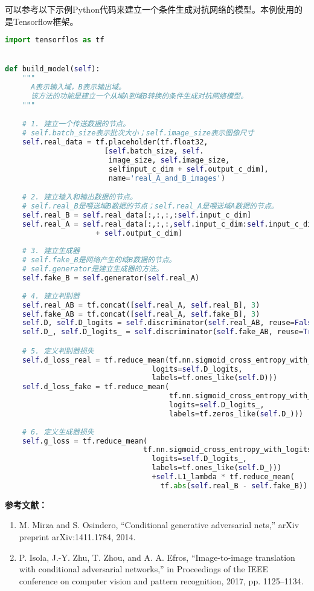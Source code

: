 可以参考以下示例Python代码来建立一个条件生成对抗网络的模型。本例使用的是Tensorflow框架。
\begin{lstlisting}[language=python]
import tensorflos as tf


def build_model(self):
    """
      A表示输入域，B表示输出域。
      该方法的功能是建立一个从域A到域B转换的条件生成对抗网络模型。
    """

    # 1. 建立一个传送数据的节点。
    # self.batch_size表示批次大小；self.image_size表示图像尺寸
    self.real_data = tf.placeholder(tf.float32,
                       [self.batch_size, self.    
                        image_size, self.image_size,
                        selfinput_c_dim + self.output_c_dim],
                        name='real_A_and_B_images')

    # 2. 建立输入和输出数据的节点。
    # self.real_B是喂送域B数据的节点；self.real_A是喂送域A数据的节点。
    self.real_B = self.real_data[:,:,:,:self.input_c_dim]
    self.real_A = self.real_data[:,:,:,self.input_c_dim:self.input_c_dim 
                     + self.output_c_dim]
    
    # 3. 建立生成器
    # self.fake_B是网络产生的域B数据的节点。
    # self.generator是建立生成器的方法。
    self.fake_B = self.generator(self.real_A)
    
    # 4. 建立判别器
    self.real_AB = tf.concat([self.real_A, self.real_B], 3)
    self.fake_AB = tf.concat([self.real_A, self.fake_B], 3)
    self.D, self.D_logits = self.discriminator(self.real_AB, reuse=False)
    self.D_, self.D_logits_ = self.discriminator(self.fake_AB, reuse=True)

    # 5. 定义判别器损失
    self.d_loss_real = tf.reduce_mean(tf.nn.sigmoid_cross_entropy_with_logits(
                                  logits=self.D_logits, 
                                  labels=tf.ones_like(self.D)))
    self.d_loss_fake = tf.reduce_mean(
                                      tf.nn.sigmoid_cross_entropy_with_logits(
                                      logits=self.D_logits_,
                                      labels=tf.zeros_like(self.D_)))
    
    # 6. 定义生成器损失
    self.g_loss = tf.reduce_mean(
                                tf.nn.sigmoid_cross_entropy_with_logits(
                                  logits=self.D_logits_,
                                  labels=tf.ones_like(self.D_)))
                                  +self.L1_lambda * tf.reduce_mean(
                                    tf.abs(self.real_B - self.fake_B))

\end{lstlisting}




\textbf{参考文献：}
\begin{enumerate}
\item M. Mirza and S. Osindero, “Conditional generative adversarial nets,” arXiv preprint arXiv:1411.1784, 2014.
\item P. Isola, J.-Y. Zhu, T. Zhou, and A. A. Efros, “Image-to-image translation with conditional adversarial networks,” in Proceedings of the IEEE conference on computer vision and pattern recognition, 2017, pp. 1125–1134.
\end{enumerate}
